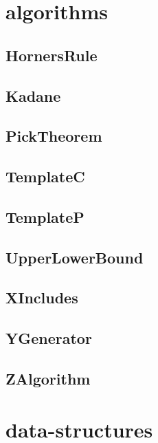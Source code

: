 \section{algorithms}
\subsection{ HornersRule}
\raggedbottom
\hrulefill
\subsection{ Kadane}
\raggedbottom
\hrulefill
\subsection{ PickTheorem}
\raggedbottom
\hrulefill
\subsection{ TemplateC}
\raggedbottom
\hrulefill
\subsection{ TemplateP}
\raggedbottom
\hrulefill
\subsection{ UpperLowerBound}
\raggedbottom
\hrulefill
\subsection{ XIncludes}
\raggedbottom
\hrulefill
\subsection{ YGenerator}
\raggedbottom
\hrulefill
\subsection{ ZAlgorithm}
\raggedbottom
\hrulefill

\section{data-structures}
